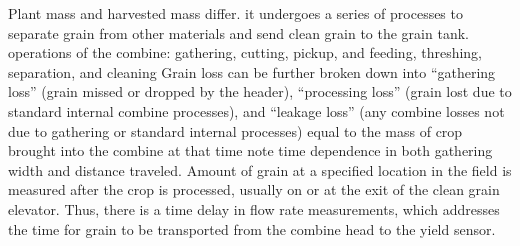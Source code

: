 
Plant mass and harvested mass differ. it undergoes a series of
processes to separate grain from other materials and send clean grain
to the grain tank. operations of the combine: gathering, cutting,
pickup, and feeding, threshing, separation, and cleaning Grain loss
can be further broken down into “gathering loss” (grain missed or
dropped by the header), “processing loss” (grain lost due to standard
internal combine processes), and “leakage loss” (any combine losses
not due to gathering or standard internal processes) equal to the mass
of crop brought into the combine at that time note time dependence in
both gathering width and distance traveled. Amount of grain at a
specified location in the field is measured after the crop is
processed, usually on or at the exit of the clean grain
elevator. Thus, there is a time delay in flow rate measurements, which
addresses the time for grain to be transported from the combine head
to the yield sensor.









